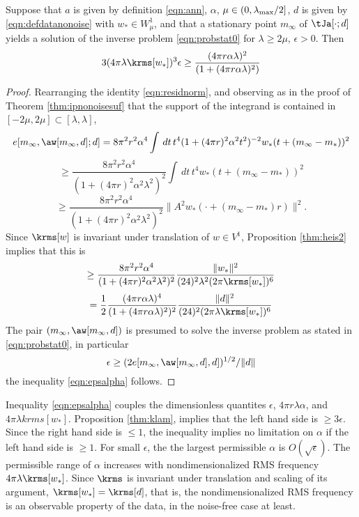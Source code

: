 \begin{theorem}
  \label{thm:ipnonoisenec}
  Suppose that $a$ is given by definition \ref{eqn:ann}, $\alpha$,
  $\mu \in (0,\lambda_{\rm max}/2]$, $d$ is given by
  \ref{eqn:defdatanonoise} with $w_* \in W_{\mu}^1$, and that a
  stationary point $m_{\infty}$ of $\tJa[\cdot;d]$ yields a solution
  of the inverse problem \ref{eqn:probstat0} for $\lambda \ge 2\mu$,
  $\epsilon>0$. Then
\begin{equation}
  \label{eqn:epsalpha}
  3 (4\pi \lambda \krms[w_*])^3 \epsilon \ge \frac{(4\pi  r\alpha\lambda)^2}
  {(1+(4\pi r \alpha \lambda)^2)}
\end{equation}
\end{theorem}

\begin{proof}
  Rearranging the identity \ref{eqn:residnorm}, and observing as in
  the proof of Theorem \ref{thm:ipnonoisesuf} that the support of the
  integrand is contained in $[-2\mu, 2\mu] \subset [\lambda,\lambda]$,
  \[
  e[m_{\infty},\aw[m_{\infty},d];d] 
= 8 \pi^2 r^2 \alpha^4\int\,dt\,t^4(1+(4\pi r)^2 \alpha^2 t^2)^{-2}w_*(t+(m_{\infty}-m_*))^2
\]
\[
  \ge \frac{8\pi^2r^2\alpha^4}{(1+(4\pi r)^2 \alpha^2
    \lambda^2)^{2}}\int\,dt\,t^4w_*(t+(m_{\infty}-m_*))^2
\]
\begin{equation}
  \label{eqn:residnormbis}
  \ge \frac{8\pi^2r^2\alpha^4}{(1+(4\pi r)^2 \alpha^2
    \lambda^2)^{2}}\|A^2w_*(\cdot + (m_{\infty}-m_*)r)\|^2.
 \end{equation}
Since $\krms[w]$ is invariant under translation of $w \in V^1$,
Proposition \ref{thm:heis2} implies that this is
\[
  \ge \frac{8\pi^2r^2\alpha^4}{(1+(4\pi r)^2 \alpha^2
    \lambda^2)^{2}}\frac{\|w_*\|^2}{(24)^2 \lambda^2 (2\pi\krms[w_*])^6}
\]
\[
  = \frac{1}{2}\frac{(4\pi r\alpha\lambda)^4}{(1+(4\pi r \alpha
    \lambda)^2)^{2}}\frac{\|d\|^2}{(24)^2 (2\pi
    \lambda \krms[w_*])^6}
\]
The pair $(m_{\infty}, \aw[m_{\infty},d])$ is presumed to solve the inverse
problem as stated in \ref{eqn:probstat0}, in particular
\[
  \epsilon \ge (2 e[m_{\infty}, \aw[m_{\infty},d],d])^{1/2}/\|d\|
\]
the inequality \ref{eqn:epsalpha} follows.

\end{proof}

Inequality \ref{eqn:epsalpha} couples the dimensionless quantites
$\epsilon$,  $4\pi r \lambda \alpha$, and $4 \pi \lambda
krms[w_*]$. Proposition \ref{thm:klam}, implies that the left
hand side is $\ge 3\epsilon$. Since the right hand side is $\le 1$,
the inequality implies no limitation on $\alpha$ if the left hand side
is $\ge 1$. For small $\epsilon$, the the largest permissible $\alpha$
is $O(\sqrt{\epsilon})$. The permissible range of $\alpha$ increases with
nondimensionalized RMS frequency $4\pi \lambda \krms[w_*]$. Since
$\krms$ is invariant under translation and scaling of its argument,
$\krms[w_*]=\krms[d]$, that is, the nondimensionalized RMS frequency
is an observable property of the data, in the noise-free case at
least.

